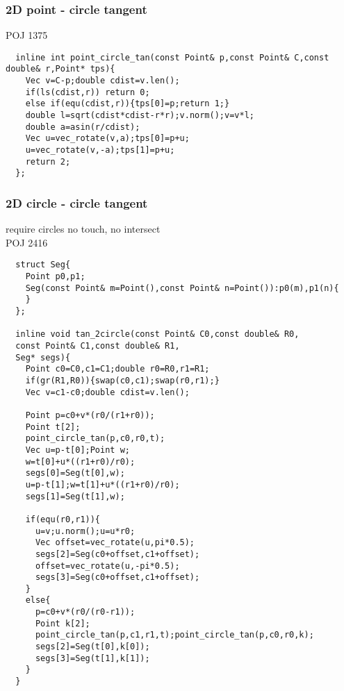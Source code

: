 \documentclass[a4paper]{article}
\begin{document}
\subsubsection{2D point - circle tangent}
POJ 1375
\begin{lstlisting}
  inline int point_circle_tan(const Point& p,const Point& C,const double& r,Point* tps){
    Vec v=C-p;double cdist=v.len();
    if(ls(cdist,r)) return 0;
    else if(equ(cdist,r)){tps[0]=p;return 1;}
    double l=sqrt(cdist*cdist-r*r);v.norm();v=v*l;
    double a=asin(r/cdist);
    Vec u=vec_rotate(v,a);tps[0]=p+u;
    u=vec_rotate(v,-a);tps[1]=p+u;
    return 2;
  };
\end{lstlisting}
\subsubsection{2D circle - circle tangent}
require circles no touch, no intersect \\
POJ 2416
\begin{lstlisting}
  struct Seg{
    Point p0,p1;
    Seg(const Point& m=Point(),const Point& n=Point()):p0(m),p1(n){
    }
  };

  inline void tan_2circle(const Point& C0,const double& R0,
  const Point& C1,const double& R1,
  Seg* segs){
    Point c0=C0,c1=C1;double r0=R0,r1=R1;
    if(gr(R1,R0)){swap(c0,c1);swap(r0,r1);}
    Vec v=c1-c0;double cdist=v.len();

    Point p=c0+v*(r0/(r1+r0));
    Point t[2];
    point_circle_tan(p,c0,r0,t);
    Vec u=p-t[0];Point w;
    w=t[0]+u*((r1+r0)/r0);
    segs[0]=Seg(t[0],w);
    u=p-t[1];w=t[1]+u*((r1+r0)/r0);
    segs[1]=Seg(t[1],w);

    if(equ(r0,r1)){
      u=v;u.norm();u=u*r0;
      Vec offset=vec_rotate(u,pi*0.5);
      segs[2]=Seg(c0+offset,c1+offset);
      offset=vec_rotate(u,-pi*0.5);
      segs[3]=Seg(c0+offset,c1+offset);
    }
    else{
      p=c0+v*(r0/(r0-r1));
      Point k[2];
      point_circle_tan(p,c1,r1,t);point_circle_tan(p,c0,r0,k);
      segs[2]=Seg(t[0],k[0]);
      segs[3]=Seg(t[1],k[1]);
    }
  }
\end{lstlisting}
\end{document}
